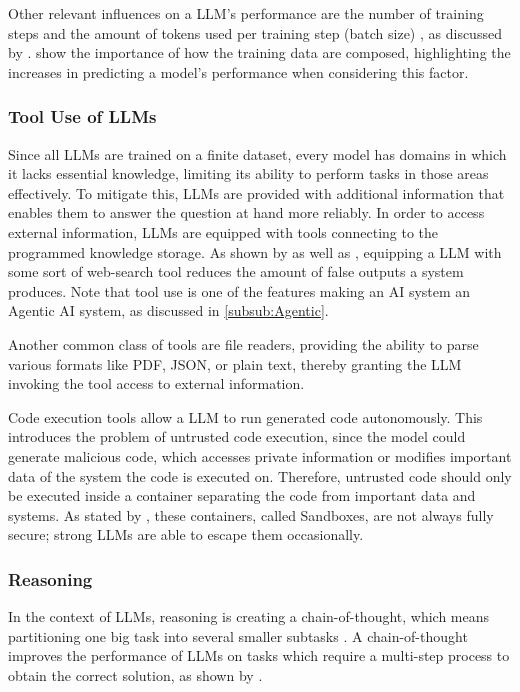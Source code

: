 \documentclass[
	fontsize = 11pt,
	paper = a4,
	draft = false,
	twoside = true,
	titlepage = false
]{scrartcl}
\numberwithin{equation}{subsection}
\begin{document}
	Other relevant influences on a \gls{LLM}'s performance are the number of training steps and the amount of \glspl{token} used per training step (batch size) \autocite{powerLaw}, as discussed by \citeauthor{powerLaw} \autocite{powerLaw}. \citeauthor{modelSelection} \autocite{modelSelection} show the importance of how the training data are composed, highlighting the increases in predicting a model's performance when considering this factor.
	
	\subsubsection{Tool Use of \gls{LLM}s} \label{subsub:tool}
	Since all \gls{LLM}s are trained on a finite dataset, every model has domains in which it lacks essential knowledge, limiting its ability to perform tasks in those areas effectively. To mitigate this, \gls{LLM}s are provided with additional information that enables them to answer the question at hand more reliably. In order to access external information, \gls{LLM}s are equipped with tools connecting to the programmed knowledge storage. As shown by \citeauthor{websearch1} \autocite{websearch1} as well as \citeauthor{websearch2} \autocite{websearch2}, equipping a \gls{LLM} with some sort of web-search tool reduces the amount of false outputs a system produces. Note that tool use is one of the features making an \gls{AI} system an \gls{Agentic AI} system, as discussed in \autoref{subsub:Agentic}.
	
	Another common class of tools are file readers, providing the ability to parse various formats like PDF, JSON, or plain text, thereby granting the \gls{LLM} invoking the tool access to external information. \autocite{crewaiTools}
	
	Code execution tools allow a \gls{LLM} to run generated code autonomously. This introduces the problem of untrusted code execution, since the model could generate malicious code, which accesses private information or modifies important data of the system the code is executed on. Therefore, untrusted code should only be executed inside a container separating the code from important data and systems. As stated by \citeauthor{sandboxEscape} \autocite{sandboxEscape}, these containers, called Sandboxes, are not always fully secure; strong \gls{LLM}s are able to escape them occasionally.

	\subsubsection{Reasoning} \label{subsub:reasoning}
	In the context of \gls{LLM}s, reasoning is creating a chain-of-thought, which means partitioning one big task into several smaller subtasks \autocite{reasoningGood}. A chain-of-thought improves the performance of \gls{LLM}s on tasks which require a multi-step process to obtain the correct solution, as shown by \citeauthor{reasoningGood} \autocite{reasoningGood}. 
	
\end{document}
